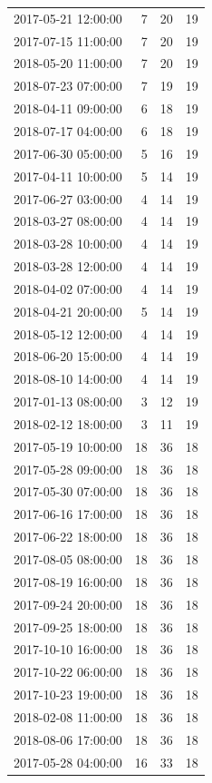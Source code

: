\begin{tabular}{lrrr}
2017-05-21 12:00:00 & 7 & 20 & 19 \\
2017-07-15 11:00:00 & 7 & 20 & 19 \\
2018-05-20 11:00:00 & 7 & 20 & 19 \\
2018-07-23 07:00:00 & 7 & 19 & 19 \\
2018-04-11 09:00:00 & 6 & 18 & 19 \\
2018-07-17 04:00:00 & 6 & 18 & 19 \\
2017-06-30 05:00:00 & 5 & 16 & 19 \\
2017-04-11 10:00:00 & 5 & 14 & 19 \\
2017-06-27 03:00:00 & 4 & 14 & 19 \\
2018-03-27 08:00:00 & 4 & 14 & 19 \\
2018-03-28 10:00:00 & 4 & 14 & 19 \\
2018-03-28 12:00:00 & 4 & 14 & 19 \\
2018-04-02 07:00:00 & 4 & 14 & 19 \\
2018-04-21 20:00:00 & 5 & 14 & 19 \\
2018-05-12 12:00:00 & 4 & 14 & 19 \\
2018-06-20 15:00:00 & 4 & 14 & 19 \\
2018-08-10 14:00:00 & 4 & 14 & 19 \\
2017-01-13 08:00:00 & 3 & 12 & 19 \\
2018-02-12 18:00:00 & 3 & 11 & 19 \\
2017-05-19 10:00:00 & 18 & 36 & 18 \\
2017-05-28 09:00:00 & 18 & 36 & 18 \\
2017-05-30 07:00:00 & 18 & 36 & 18 \\
2017-06-16 17:00:00 & 18 & 36 & 18 \\
2017-06-22 18:00:00 & 18 & 36 & 18 \\
2017-08-05 08:00:00 & 18 & 36 & 18 \\
2017-08-19 16:00:00 & 18 & 36 & 18 \\
2017-09-24 20:00:00 & 18 & 36 & 18 \\
2017-09-25 18:00:00 & 18 & 36 & 18 \\
2017-10-10 16:00:00 & 18 & 36 & 18 \\
2017-10-22 06:00:00 & 18 & 36 & 18 \\
2017-10-23 19:00:00 & 18 & 36 & 18 \\
2018-02-08 11:00:00 & 18 & 36 & 18 \\
2018-08-06 17:00:00 & 18 & 36 & 18 \\
2017-05-28 04:00:00 & 16 & 33 & 18 \\

\end{tabular}
